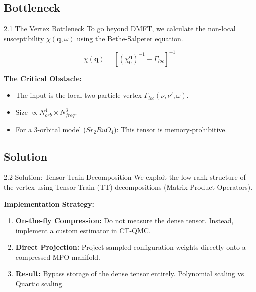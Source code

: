 \documentclass[aspectratio=169, 11pt]{beamer}
\begin{document}
\subsection{Bottleneck}
\begin{frame}{2.1 The Vertex Bottleneck}
    To go beyond DMFT, we calculate the non-local susceptibility $\chi(\mathbf{q}, \omega)$ using the Bethe-Salpeter equation.
    
    $$ \chi(\mathbf{q}) = \left[ (\chi_0^{\mathbf{q}})^{-1} - \Gamma_{loc} \right]^{-1} $$
    
    \textbf{The Critical Obstacle:}
    \begin{itemize}
        \item The input is the local two-particle vertex $\Gamma_{loc}(\nu, \nu', \omega)$.
        \item Size $\propto N_{orb}^4 \times N_{freq}^3$.
        \item For a 3-orbital model ($Sr_2RuO_4$): This tensor is memory-prohibitive.
    \end{itemize}
\end{frame}

\subsection{Solution}
\begin{frame}{2.2 Solution: Tensor Train Decomposition}
    We exploit the low-rank structure of the vertex using Tensor Train (TT) decompositions (Matrix Product Operators).
    
    \textbf{Implementation Strategy:}
    \begin{enumerate}
        \item \textbf{On-the-fly Compression:} 
        Do not measure the dense tensor. Instead, implement a custom estimator in CT-QMC.
        \item \textbf{Direct Projection:}
        Project sampled configuration weights directly onto a compressed MPO manifold.
        \item \textbf{Result:}
        Bypass storage of the dense tensor entirely. Polynomial scaling vs Quartic scaling.
    \end{enumerate}
\end{frame}
\end{document}

